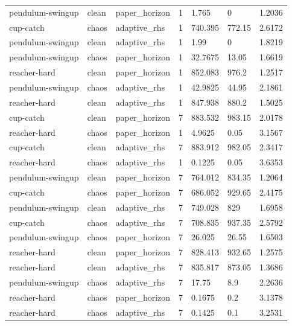 \begin{tabular}{lllllll}
pendulum-swingup & clean & paper\_horizon & 1 & 1.765 & 0 & 1.2036 \\
cup-catch & chaos & adaptive\_rhs & 1 & 740.395 & 772.15 & 2.6172 \\
pendulum-swingup & clean & adaptive\_rhs & 1 & 1.99 & 0 & 1.8219 \\
pendulum-swingup & chaos & paper\_horizon & 1 & 32.7675 & 13.05 & 1.6619 \\
reacher-hard & clean & paper\_horizon & 1 & 852.083 & 976.2 & 1.2517 \\
pendulum-swingup & chaos & adaptive\_rhs & 1 & 42.9825 & 44.95 & 2.1861 \\
reacher-hard & clean & adaptive\_rhs & 1 & 847.938 & 880.2 & 1.5025 \\
cup-catch & clean & paper\_horizon & 7 & 883.532 & 983.15 & 2.0178 \\
reacher-hard & chaos & paper\_horizon & 1 & 4.9625 & 0.05 & 3.1567 \\
cup-catch & clean & adaptive\_rhs & 7 & 883.912 & 982.05 & 2.3417 \\
reacher-hard & chaos & adaptive\_rhs & 1 & 0.1225 & 0.05 & 3.6353 \\
pendulum-swingup & clean & paper\_horizon & 7 & 764.012 & 834.35 & 1.2064 \\
cup-catch & chaos & paper\_horizon & 7 & 686.052 & 929.65 & 2.4175 \\
pendulum-swingup & clean & adaptive\_rhs & 7 & 749.028 & 829 & 1.6958 \\
cup-catch & chaos & adaptive\_rhs & 7 & 708.835 & 937.35 & 2.5792 \\
pendulum-swingup & chaos & paper\_horizon & 7 & 26.025 & 26.55 & 1.6503 \\
reacher-hard & clean & paper\_horizon & 7 & 828.413 & 932.65 & 1.2575 \\
reacher-hard & clean & adaptive\_rhs & 7 & 835.817 & 873.05 & 1.3686 \\
pendulum-swingup & chaos & adaptive\_rhs & 7 & 17.75 & 8.9 & 2.2636 \\
reacher-hard & chaos & paper\_horizon & 7 & 0.1675 & 0.2 & 3.1378 \\
reacher-hard & chaos & adaptive\_rhs & 7 & 0.1425 & 0.1 & 3.2531 \\
\bottomrule
\end{tabular}
